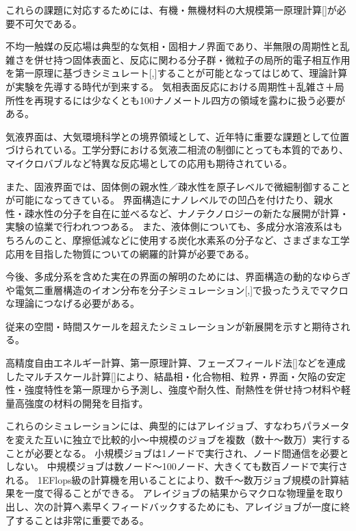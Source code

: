 これらの課題に対応するためには、有機・無機材料の大規模第一原理計算[]が必要不可欠である。


不均一触媒の反応場は典型的な気相・固相ナノ界面であり、半無限の周期性と乱雑さを併せ持つ固体表面と、反応に関わる分子群・微粒子の局所的電子相互作用を第一原理に基づきシミュレート[,]することが可能となってはじめて、理論計算が実験を先導する時代が到来する。
気相表面反応における周期性＋乱雑さ＋局所性を再現するには少なくとも100ナノメートル四方の領域を露わに扱う必要がある。

気液界面は、大気環境科学との境界領域として、近年特に重要な課題として位置づけられている。工学分野における気液二相流の制御にとっても本質的であり、マイクロバブルなど特異な反応場としての応用も期待されている。

また、固液界面では、固体側の親水性／疎水性を原子レベルで微細制御することが可能になってきている。
界面構造にナノレベルでの凹凸を付けたり、親水性・疎水性の分子を自在に並べるなど、ナノテクノロジーの新たな展開が計算・実験の協業で行われつつある。
また、液体側についても、多成分水溶液系はもちろんのこと、摩擦低減などに使用する炭化水素系の分子など、さまざまな工学応用を目指した物質についての網羅的計算が必要である。

今後、多成分系を含めた実在の界面の解明のためには、界面構造の動的なゆらぎや電気二重層構造のイオン分布を分子シミュレーション[,]で扱ったうえでマクロな理論につなげる必要がある。

従来の空間・時間スケールを超えたシミュレーションが新展開を示すと期待される。


高精度自由エネルギー計算、第一原理計算、フェーズフィールド法[]などを連成したマルチスケール計算[]により、結晶相・化合物相、粒界・界面・欠陥の安定性・強度特性を第一原理から予測し、強度や耐久性、耐熱性を併せ持つ材料や軽量高強度の材料の開発を目指す。

これらのシミュレーションには、典型的にはアレイジョブ、すなわちパラメータを変えた互いに独立で比較的小～中規模のジョブを複数（数十～数万）実行することが必要となる。
小規模ジョブは1ノードで実行され、ノード間通信を必要としない。
中規模ジョブは数ノード～100ノード、大きくても数百ノードで実行される。
1EFlops級の計算機を用いることにより、数千～数万ジョブ規模の計算結果を一度で得ることができる。
アレイジョブの結果からマクロな物理量を取り出し、次の計算へ素早くフィードバックするためにも、アレイジョブが一度に終了することは非常に重要である。



